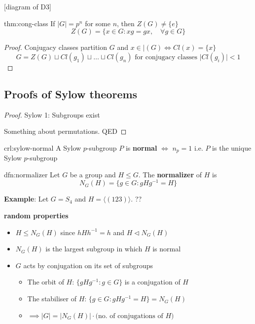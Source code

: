 \documentclass{article}
\begin{document}
[diagram of D3]


\newpage

\begin{thm}{thm:cong-class}{}
    If $\lvert G \rvert = p^{n}$ for some $n$, then $Z(G) \ne \{e\}$
    \[Z(G) = \{x \in G : xg = gx, \quad \forall g\in G\}\]
\end{thm}

\begin{proof}
    Conjugacy classes partition $G$ and $x\in |(G) \iff Cl(x) = \{x\}$
    \[G = Z(G) \sqcup Cl(g_{1}) \sqcup \dots \sqcup Cl(g_{n}) \text{ for conjugacy classes } \lvert Cl(g_{i}) \rvert < 1\]
\end{proof}

\subsection{Proofs of Sylow theorems}

\begin{proof}
    Sylow 1: Subgroups exist

    Something about permutations. QED
\end{proof}

\begin{crl}[]{crl:sylow-normal}{}
    A Sylow $p$-subgroup $P$ is \textbf{normal} $\iff$ $n_{p} = 1$ i.e. $P$ is the unique Sylow $p$-subgroup
\end{crl}

\begin{dfn}[Normalizer]{dfn:normalizer}{}
    Let $G$ be a group and $H \le G$. The \textbf{normalizer} of $H$ is
    \[N_{G}(H) = \{g \in G : gHg^{-1} = H\}\]
\end{dfn}

\textbf{Example}: Let $G = S_{4}$ and $H = \langle (123) \rangle$. ??

\textbf{random properties}
\begin{itemize}
    \item $H \le N_{G}(H)$ since $hHh^{-1} = h$ and $H \lhd N_{G}(H)$
    \item $N_{G}(H)$ is the largest subgroup in which $H$ is normal
    \item $G$ acts by conjugation on its set of subgroups
        \begin{itemize}
            \item The orbit of $H$: $\{gHg^{-1} : g\in G\}$ is a conjugation of $H$
            \item The stabiliser of $H$: $\{g\in G : gHg^{-1} = H\} = N_{G}(H)$ 
            \item $ \implies \lvert G \rvert = \lvert N_{G}(H) \rvert \cdot \text{(no. of conjugations of $H$)}$
        \end{itemize}
\end{itemize}
\end{document}

